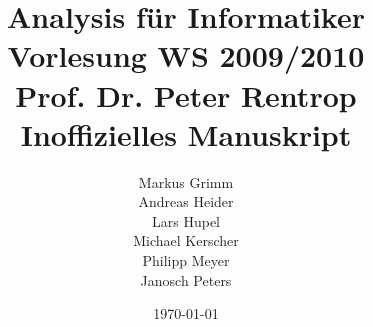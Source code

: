 


\title{Analysis für Informatiker\\\large Vorlesung WS 2009/2010\\Prof. Dr. Peter Rentrop\\Inoffizielles Manuskript}
\author{Markus Grimm\\ Andreas Heider\\ Lars Hupel\\ Michael Kerscher\\ Philipp Meyer\\Janosch Peters}
\date{\today}



\maketitle

\newpage
\listoftodos
\newpage
\tableofcontents
\newpage
{}
{}
\listoflectures
\newpage














\newpage
{}
{}



